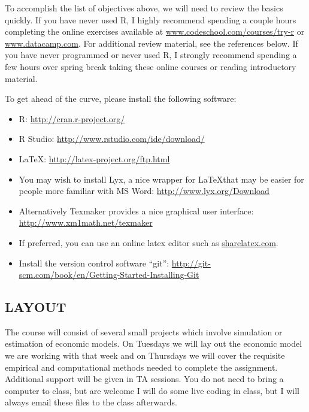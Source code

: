 \documentclass{scrartcl}
\begin{document}
To accomplish the list of objectives above, we will need to review the basics quickly. If you have never used R, I highly recommend spending a couple hours completing the online exercises available at \href{www.codeschool.com/courses/try-r}{www.codeschool.com/courses/try-r} or  \href{www.datacamp.com}{www.datacamp.com}. For additional review material, see the references below. If you have never programmed or never used R, I strongly recommend spending a few hours over spring break taking these online courses or reading introductory material. 

To get ahead of the curve, please install the following software:
\begin{itemize}
\item R: \href{http://cran.r-project.org/}{http://cran.r-project.org/}
\item R Studio: \href{http://www.rstudio.com/ide/download/}{http://www.rstudio.com/ide/download/}
\item \LaTeX: \href{http://latex-project.org/ftp.html}{http://latex-project.org/ftp.html}
\item You may wish to install Lyx, a nice wrapper for \LaTeX that may be easier for people more familiar with MS Word: \href{http://www.lyx.org/Download}{http://www.lyx.org/Download}
\item Alternatively Texmaker provides a nice graphical user interface: \href{http://www.xm1math.net/texmaker}{http://www.xm1math.net/texmaker}
\item If preferred, you can use an online latex editor such as \href{sharelatex.com}{sharelatex.com}.
\item Install the version control software ``git'': \href{http://git-scm.com/book/en/Getting-Started-Installing-Git}{http://git-scm.com/book/en/Getting-Started-Installing-Git}
\end{itemize}

\subsection*{LAYOUT}

The course will consist of several small projects which involve simulation or estimation of economic models. On Tuesdays we will lay out the economic model we are working with that week and on Thursdays we will cover the requisite empirical and computational methods needed to complete the assignment. Additional support will be given in TA sessions. You do not need to bring a computer to class, but are welcome I will do some live coding in class, but I will always email these files to the class afterwards. 
\end{document}
